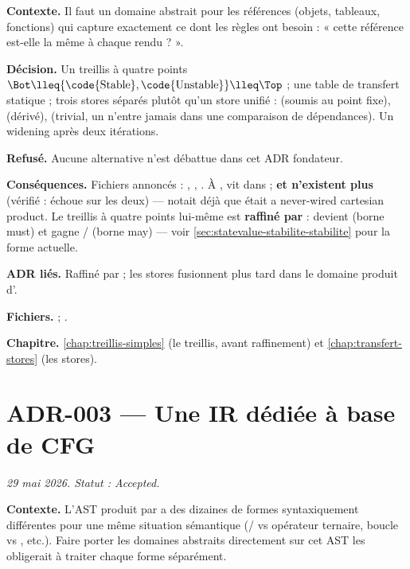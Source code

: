 \textbf{Contexte.} Il faut un domaine abstrait pour les références (objets,
tableaux, fonctions) qui capture exactement ce dont les règles ont besoin :
« cette référence est-elle la même à chaque rendu ? ».

\textbf{Décision.} Un treillis à quatre points $\Bot \lleq \{\text{\code{Stable}},
\text{\code{Unstable}}\} \lleq \Top$ ; une table de transfert statique ; trois
stores séparés plutôt qu'un store unifié :  (soumis au point
fixe),  (dérivé),  (trivial, un 
n'entre jamais dans une comparaison de dépendances). Un widening après deux
itérations.

\textbf{Refusé.} Aucune alternative n'est débattue dans cet ADR fondateur.

\textbf{Conséquences.} Fichiers annoncés : , ,
. À \code{\snapshotCommit},  vit dans
 ; \textbf{
et  n'existent plus} (vérifié : 
échoue sur les deux) —  notait déjà que 
était \og a never-wired cartesian product\fg{}. Le treillis à quatre points
lui-même est \textbf{raffiné par } :  devient
 (borne must) et gagne /
(borne may) — voir \cref{sec:statevalue-stabilite-stabilite} pour la forme
actuelle.

\textbf{ADR liés.} Raffiné par  ; les stores fusionnent plus tard dans
le domaine produit d'.

\textbf{Fichiers.}  ; .

\textbf{Chapitre.} \cref{chap:treillis-simples} (le treillis, avant
raffinement) et \cref{chap:transfert-stores} (les stores).

\section{ADR-003 --- Une IR dédiée à base de CFG}
\label{adr:3}
\noindent\textit{29 mai 2026. Statut : Accepted.}

\textbf{Contexte.} L'AST produit par  a des dizaines de formes
syntaxiquement différentes pour une même situation sémantique (/
vs opérateur ternaire, boucle  vs , etc.). Faire porter
les domaines abstraits directement sur cet AST les obligerait à traiter
chaque forme séparément.

